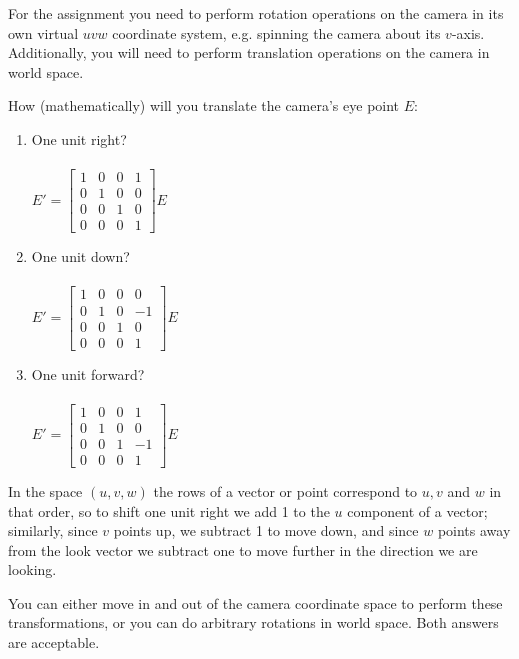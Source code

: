 \documentclass[10pt,twocolumn]{article}
\begin{document}
\noindent For the assignment you need to perform rotation operations on the camera in its own virtual $uvw$ coordinate system, e.g. spinning the camera about its $v$-axis. Additionally, you will need to perform translation operations on the camera in world space.
\begin{framed}
\noindent {\bf [1/2 pt. each]} How (mathematically) will you translate the camera's eye point $E$:
\begin{enumerate}
\item One unit right? \\\\$E' = \begin{bmatrix}
1 & 0 & 0 &  1 \\
0 & 1 & 0 &  0 \\
0 & 0 & 1 &  0 \\
0 & 0 & 0 &  1
\end{bmatrix} E$\\
\item One unit down? \\\\$E' = \begin{bmatrix}
1 & 0 & 0 &  0 \\
0 & 1 & 0 & -1 \\
0 & 0 & 1 &  0 \\
0 & 0 & 0 &  1
\end{bmatrix} E$\\
\item One unit forward? \\\\$E' = \begin{bmatrix}
1 & 0 & 0 &  1 \\
0 & 1 & 0 &  0 \\
0 & 0 & 1 & -1 \\
0 & 0 & 0 &  1
\end{bmatrix} E$\\
\end{enumerate}

In the space $(u, v, w)$ the rows of a vector or point correspond to $u, v$ and $w$ in that order, so to shift one unit right we add 1 to the $u$ component of a vector; similarly, since $v$ points up, we subtract 1 to move down, and since $w$ points away from the look vector we subtract one to move further in the direction we are looking.

\end{framed}

\noindent You can either move in and out of the camera coordinate space to perform these transformations, or you can do arbitrary rotations in world space. Both answers are acceptable.
\end{document}
